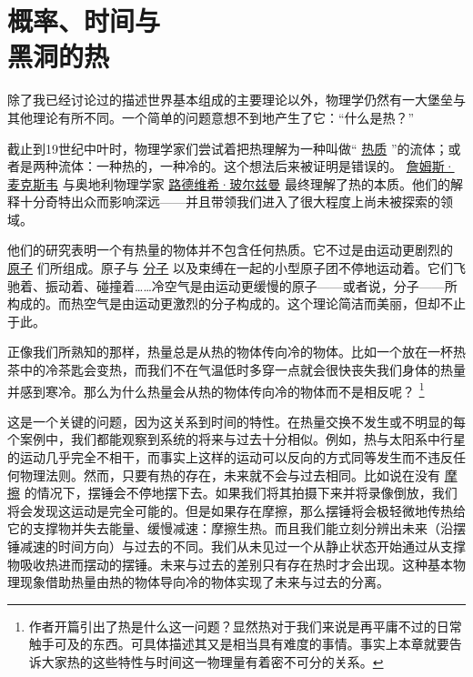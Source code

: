 	\chapter{概率、时间与\\黑洞的热}
\indent

    除了我已经讨论过的描述世界基本组成的主要理论以外，物理学仍然有一大堡垒与其他理论有所不同。一个简单的问题意想不到地产生了它：“什么是热？”

    截止到19世纪中叶时，物理学家们尝试着把热理解为一种叫做“
\href{http://toyhouse.cc/wiki/index.php/热质}{热质}
”的流体；或者是两种流体：一种热的，一种冷的。这个想法后来被证明是错误的。
\href{http://toyhouse.cc/wiki/index.php/詹姆斯·克拉克·麦克斯韦}{詹姆斯·麦克斯韦}
与奥地利物理学家
\href{http://toyhouse.cc/wiki/index.php/路德维希·玻尔兹曼}{路德维希·玻尔兹曼}
最终理解了热的本质。他们的解释十分奇特出众而影响深远——并且带领我们进入了很大程度上尚未被探索的领域。

    他们的研究表明一个有热量的物体并不包含任何热质。它不过是由运动更剧烈的
\href{http://toyhouse.cc/wiki/index.php/原子}{原子}
们所组成。原子与
\href{http://toyhouse.cc/wiki/index.php/分子}{分子}
以及束缚在一起的小型原子团不停地运动着。它们飞驰着、振动着、碰撞着……冷空气是由运动更缓慢的原子——或者说，分子——所构成的。而热空气是由运动更激烈的分子构成的。这个理论简洁而美丽，但却不止于此。

    正像我们所熟知的那样，热量总是从热的物体传向冷的物体。比如一个放在一杯热茶中的冷茶匙会变热，而我们不在气温低时多穿一点就会很快丧失我们身体的热量并感到寒冷。那么为什么热量会从热的物体传向冷的物体而不是相反呢？
\footnote[1]
{
作者开篇引出了热是什么这一问题？显然热对于我们来说是再平庸不过的日常触手可及的东西。可具体描述其又是相当具有难度的事情。事实上本章就要告诉大家热的这些特性与时间这一物理量有着密不可分的关系。
}

    这是一个关键的问题，因为这关系到时间的特性。在热量交换不发生或不明显的每个案例中，我们都能观察到系统的将来与过去十分相似。例如，热与太阳系中行星的运动几乎完全不相干，而事实上这样的运动可以反向的方式同等发生而不违反任何物理法则。然而，只要有热的存在，未来就不会与过去相同。比如说在没有
\href{http://toyhouse.cc/wiki/index.php/摩擦}{摩擦}
的情况下，摆锤会不停地摆下去。如果我们将其拍摄下来并将录像倒放，我们将会发现这运动是完全可能的。但是如果存在摩擦，那么摆锤将会极轻微地传热给它的支撑物并失去能量、缓慢减速：摩擦生热。而且我们能立刻分辨出未来（沿摆锤减速的时间方向）与过去的不同。我们从未见过一个从静止状态开始通过从支撑物吸收热进而摆动的摆锤。未来与过去的差别只有存在热时才会出现。这种基本物理现象借助热量由热的物体导向冷的物体实现了未来与过去的分离。

